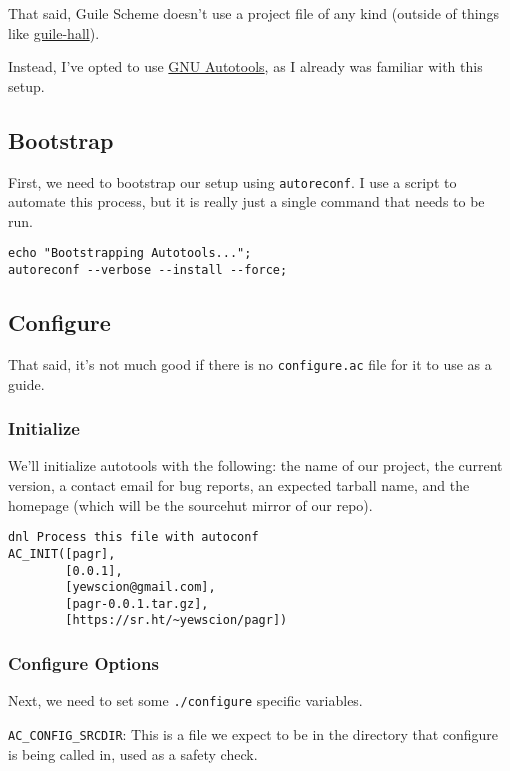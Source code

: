 \documentclass[11pt]{article}
\begin{document}
That said, Guile Scheme doesn't use a project file of any kind (outside of
things like \href{https://gitlab.com/a-sassmannshausen/guile-hall}{guile-hall}).

Instead, I've opted to use \href{https://www.gnu.org/software/automake/faq/autotools-faq.html}{GNU Autotools}, as I already was familiar with this
setup.

\subsection{Bootstrap}
\label{sec:org3040b24}
First, we need to bootstrap our setup using \texttt{autoreconf}. I use a script to
automate this process, but it is really just a single command that needs to be
run.

\begin{verbatim}
echo "Bootstrapping Autotools...";
autoreconf --verbose --install --force;
\end{verbatim}

\subsection{Configure}
\label{sec:org02a7e57}
That said, it's not much good if there is no \texttt{configure.ac} file for it to use
as a guide.

\subsubsection{Initialize}
\label{sec:org63e0655}

We'll initialize autotools with the following: the name of our project, the
current version, a contact email for bug reports, an expected tarball name, and
the homepage (which will be the sourcehut mirror of our repo).

\begin{verbatim}
dnl Process this file with autoconf
AC_INIT([pagr],
        [0.0.1],
        [yewscion@gmail.com],
        [pagr-0.0.1.tar.gz],
        [https://sr.ht/~yewscion/pagr])
\end{verbatim}

\subsubsection{Configure Options}
\label{sec:org72e0f26}
Next, we need to set some \texttt{./configure} specific variables.

\texttt{AC\_CONFIG\_SRCDIR}: This is a file we expect to be in the directory that
configure is being called in, used as a safety check.
\end{document}
